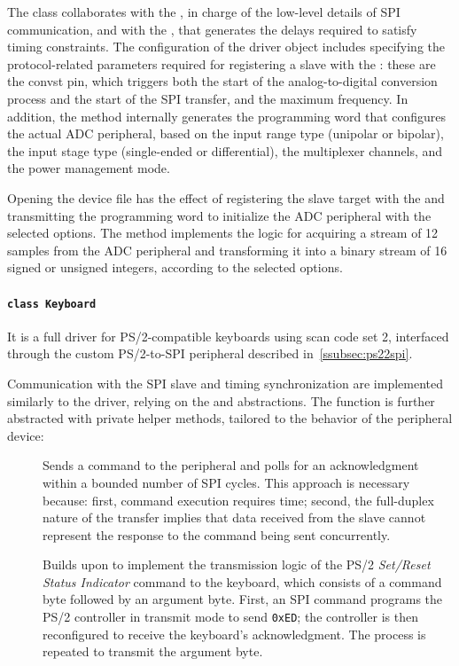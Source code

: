 The class collaborates with the , in charge of the low-level details of SPI communication, and with the , that generates the delays required to satisfy timing constraints.
The configuration of the driver object includes specifying the protocol-related parameters required for registering a slave with the : these are the \ac{convst} pin, which triggers both the start of the analog-to-digital conversion process and the start of the SPI transfer, and the maximum  frequency.
In addition, the  method internally generates the programming word that configures the actual ADC peripheral, based on the input range type (unipolar or bipolar), the input stage type (single-ended or differential), the multiplexer channels, and the power management mode.

Opening the device file has the effect of registering the slave target with the  and transmitting the programming word to initialize the ADC peripheral with the selected options. 
The  method implements the logic for acquiring a stream of \qty{12}{\bit} samples from the ADC peripheral and transforming it into a binary stream of \qty{16}{\bit} signed or unsigned integers, according to the selected options.

\paragraph{\texttt{class Keyboard}}

It is a full driver for PS/2-compatible keyboards using scan code set 2, interfaced through the custom PS/2-to-SPI peripheral described in~\cref{ssubsec:ps22spi}.

Communication with the SPI slave and timing synchronization are implemented similarly to the  driver, relying on the  and  abstractions. The  function is further abstracted with private helper methods, tailored to the behavior of the peripheral device:
\begin{description}
    \item[] Sends a command to the peripheral and polls for an acknowledgment within a bounded number of SPI cycles. This approach is necessary because: first, command execution requires time; second, the full-duplex nature of the transfer implies that data received from the slave cannot represent the response to the command being sent concurrently.

    \item[] Builds upon  to implement the transmission logic of the PS/2 \textit{Set/Reset Status Indicator} command to the keyboard, which consists of a command byte followed by an argument byte. First, an SPI command programs the PS/2 controller in transmit mode to send \texttt{0xED}; the controller is then reconfigured to receive the keyboard's acknowledgment. The process is repeated to transmit the argument byte.
\end{description}

